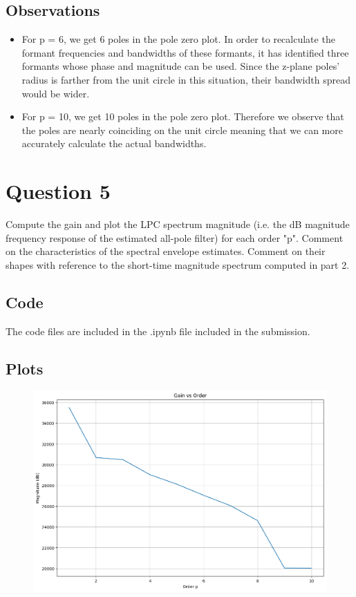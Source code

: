 \documentclass{article}
\begin{document}
\subsection{Observations}
\begin{itemize}
\item For p = 6, we get 6 poles in the pole zero plot. In order to recalculate the formant frequencies and bandwidths of these formants, it has identified three formants whose phase and magnitude can be used. Since the z-plane poles' radius is farther from the unit circle in this situation, their bandwidth spread would be wider.

\item For p = 10, we get 10 poles in the pole zero plot. Therefore we observe that the poles are nearly coinciding on the unit circle meaning that we can more accurately calculate the actual bandwidths.

\end{itemize}



\section{Question 5}
Compute the gain and plot the LPC spectrum magnitude (i.e. the dB magnitude frequency response of the estimated all-pole filter) for each order "p". Comment on the characteristics of the spectral envelope estimates. Comment on their shapes with reference to the short-time magnitude spectrum computed in part 2.



\subsection{Code}
The code files are included in the .ipynb file included in the submission.

\subsection{Plots}

\begin{figure}[H]
\begin{center}
\includegraphics[scale = 0.5]{gain1.png}
\end{center}
\end{figure}
\end{document}
